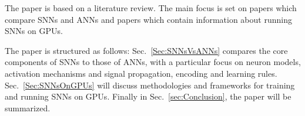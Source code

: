 The paper is based on a literature review.
The main focus is set on papers which compare \acp{SNN} and \acp{ANN} and papers which contain information about running \acp{SNN} on \acp{GPU}.

The paper is structured as follows:
Sec.~\ref{Sec:SNNsVsANNs} compares the core components of \acp{SNN} to those of \acp{ANN}, with a particular focus on neuron models, activation mechanisms and signal propagation, encoding and learning rules.
Sec.~\ref{Sec:SNNsOnGPUs} will discuss methodologies and frameworks for training and running \acp{SNN} on \acp{GPU}.
Finally in Sec.~\ref{sec:Conclusion}, the paper will be summarized.